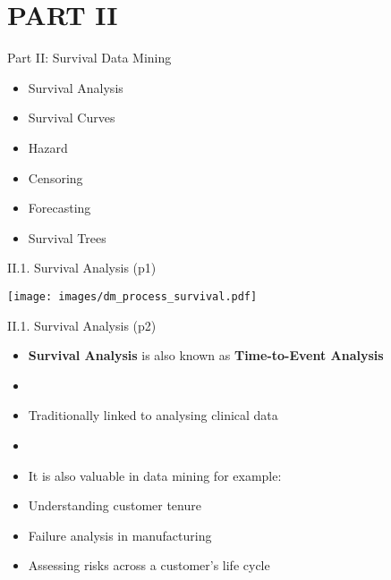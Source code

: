 \documentclass[handout]{beamer}
\newcommand{\stronger}[1]{\textbf{\color{purple} #1}}
\begin{document}
\section{PART II}
\begin{frame}{Part II: Survival Data Mining}
\begin{itemize}
\item[II.1] Survival Analysis
\item[II.2] Survival Curves
\item[II.3] Hazard
\item[II.4] Censoring
\item[II.5] Forecasting
\item[II.6] Survival Trees
\end{itemize}
\end{frame}
\begin{frame}{II.1. Survival Analysis (p1)}
\begin{center}
\texttt{[image: images/dm\_process\_survival.pdf]}
\end{center}
\end{frame}
\begin{frame}{II.1. Survival Analysis (p2)}
\begin{itemize}
\item \stronger{Survival Analysis} is also known as \stronger{Time-to-Event Analysis}
\item[]
\item Traditionally linked to analysing clinical data
\item[]
\item It is also valuable in data mining for example:
\item[--] Understanding customer tenure
\item[--] Failure analysis in manufacturing
\item[--] Assessing risks across a customer's life cycle
\end{itemize}
\end{frame}
\end{document}
